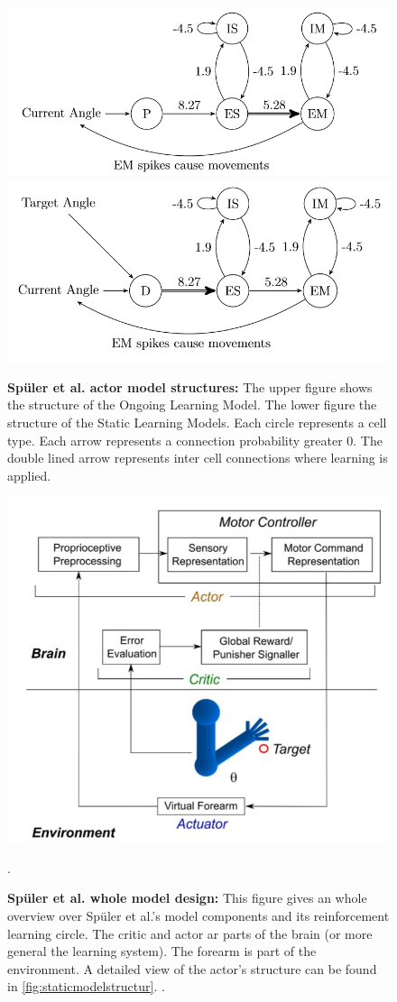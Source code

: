 \begin{figure}[tb]
	\centering
	\includegraphics[width=0.7\linewidth]{figures/ModelSebastian/OngoingModelStructure}
	\includegraphics[width=0.7\linewidth]{figures/ModelSebastian/StaticModelStructur}
	\caption[Spüler et al. actor model structures]{\textbf{Spüler et al. actor model structures:} The upper figure shows the structure of the Ongoing Learning Model. The lower figure the structure of the Static Learning Models. Each circle represents a cell type. Each arrow represents a connection probability greater 0. The double lined arrow represents inter cell connections where learning is applied. \cite[p. 25,41]{sebastianMasterThesis}}
	\label{fig:modelstructur}
\end{figure}


\begin{figure}[tb]
	\centering
	\includegraphics[width=0.7\linewidth]{figures/ModelSebastian/ReinforcementCircle}
	\caption[Spüler et al. whole model design]{\textbf{Spüler et al. whole model design:} This figure gives an whole overview over Spüler et al.'s model components and its reinforcement learning circle. The critic and actor ar parts of the brain (or more general the learning system). The forearm is part of the environment. A detailed view of the actor's structure can be found in \ref{fig:staticmodelstructur}. \cite[p. 3]{chadderdonNeuronalModel}.}
.	\label{fig:reinforcementcircle}
\end{figure}

